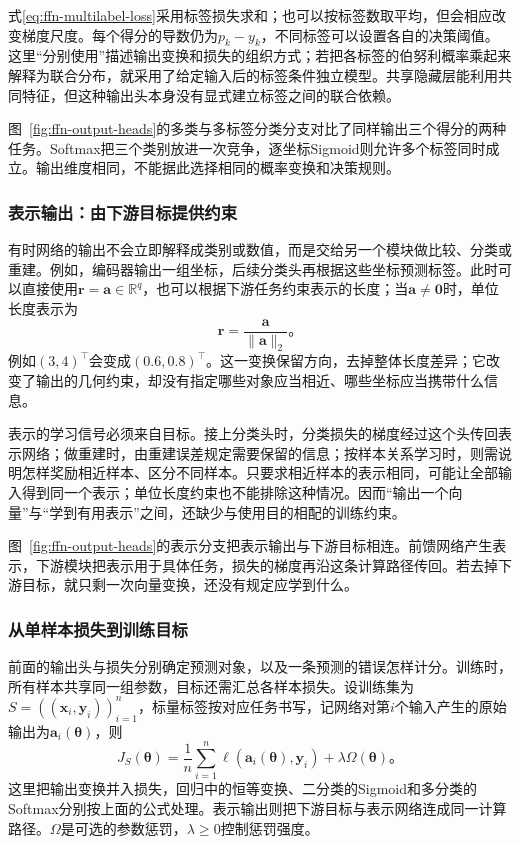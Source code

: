 式\eqref{eq:ffn-multilabel-loss}采用标签损失求和；也可以按标签数取平均，但会相应改变梯度尺度。每个得分的导数仍为$p_k-y_k$，不同标签可以设置各自的决策阈值。这里“分别使用”描述输出变换和损失的组织方式；若把各标签的伯努利概率乘起来解释为联合分布，就采用了给定输入后的标签条件独立模型。共享隐藏层能利用共同特征，但这种输出头本身没有显式建立标签之间的联合依赖。

图~\ref{fig:ffn-output-heads}的多类与多标签分类分支对比了同样输出三个得分的两种任务。Softmax把三个类别放进一次竞争，逐坐标Sigmoid则允许多个标签同时成立。输出维度相同，不能据此选择相同的概率变换和决策规则。


\subsubsection{表示输出：由下游目标提供约束}
\label{sec:ffn-output-representation}

有时网络的输出不会立即解释成类别或数值，而是交给另一个模块做比较、分类或重建。例如，编码器输出一组坐标，后续分类头再根据这些坐标预测标签。此时可以直接使用$\bm{r}=\bm{a}\in\mathbb{R}^{q}$，也可以根据下游任务约束表示的长度；当$\bm{a}\neq\bm{0}$时，单位长度表示为
\begin{equation}
  \bm{r}=\frac{\bm{a}}{\lVert\bm{a}\rVert_2}\text{。}
  \label{eq:ffn-normalized-representation}
\end{equation}
例如$(3,4)^{\top}$会变成$(0.6,0.8)^{\top}$。这一变换保留方向，去掉整体长度差异；它改变了输出的几何约束，却没有指定哪些对象应当相近、哪些坐标应当携带什么信息。

表示的学习信号必须来自目标。接上分类头时，分类损失的梯度经过这个头传回表示网络；做重建时，由重建误差规定需要保留的信息；按样本关系学习时，则需说明怎样奖励相近样本、区分不同样本。只要求相近样本的表示相同，可能让全部输入得到同一个表示；单位长度约束也不能排除这种情况。因而“输出一个向量”与“学到有用表示”之间，还缺少与使用目的相配的训练约束。

图~\ref{fig:ffn-output-heads}的表示分支把表示输出与下游目标相连。前馈网络产生表示，下游模块把表示用于具体任务，损失的梯度再沿这条计算路径传回。若去掉下游目标，就只剩一次向量变换，还没有规定应学到什么。


\subsubsection{从单样本损失到训练目标}
\label{sec:ffn-empirical-objective}

前面的输出头与损失分别确定预测对象，以及一条预测的错误怎样计分。训练时，所有样本共享同一组参数，目标还需汇总各样本损失。设训练集为$S=((\bm{x}_i,\bm{y}_i))_{i=1}^{n}$，标量标签按对应任务书写，记网络对第$i$个输入产生的原始输出为$\bm{a}_i(\bm{\theta})$，则
\begin{equation}
  J_S(\bm{\theta})=
  \frac1n\sum_{i=1}^{n}\ell\!\left(\bm{a}_i(\bm{\theta}),\bm{y}_i\right)
  +\lambda\Omega(\bm{\theta})\text{。}
  \label{eq:ffn-training-objective}
\end{equation}
这里把输出变换并入损失，回归中的恒等变换、二分类的Sigmoid和多分类的Softmax分别按上面的公式处理。表示输出则把下游目标与表示网络连成同一计算路径。$\Omega$是可选的参数惩罚，$\lambda\geq0$控制惩罚强度。

